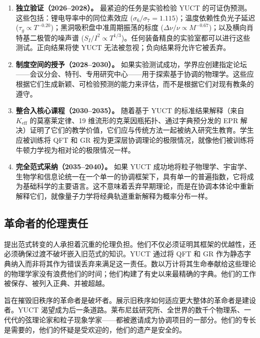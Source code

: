 \documentclass[12pt,a4paper]{article}
\begin{document}
	\begin{enumerate}
		\item \textbf{独立验证（2026–2028）。} 最紧迫的任务是实验检验 YUCT 的可证伪预测。这些包括：锂电导率中的同位素效应 (\(\sigma_6/\sigma_7 = 1.115\))；温度依赖性负光子延迟 (\(\tau_g \propto T^{-0.20}\))；黑洞吸积盘中准周期振荡的标度 (\(\Delta\nu/\nu \propto M^{-0.67}\))；以及横向肖特基二极管的噪声谱 (\(S_I/I^2 \propto T^{1/3}\))。任何装备精良的实验室都可以进行这些测试。正向结果将使 YUCT 无法被忽视；负向结果将允许它被丢弃。
		
		\item \textbf{制度空间的授予（2028–2030）。} 如果实验测试成功，学界应创建指定论坛——会议分会、特刊、专用研究中心——用于探索基于协调的物理学。这些应根据它们生成新颖、可检验预测的能力来评估，而不是根据它们对现有教条的遵守。
		
		\item \textbf{整合入核心课程（2030–2035）。} 随着基于 YUCT 的标准结果解释（来自 \(K_{\mathrm{eff}}\) 的莫塞莱定律、19 维流形的克莱因瓶拓扑、通过字典预分发的 EPR 解决）证明了它们的教学价值，它们应与传统方法一起被纳入研究生教育。学生应被训练将 QFT 和 GR 视为更深层协调理论的极限情况，就像他们被训练将牛顿力学视为相对论的极限情况一样。
		
		\item \textbf{完全范式采纳（2035–2040）。} 如果 YUCT 成功地将粒子物理学、宇宙学、生物学和信息论统一在一个单一的协调框架下，具有单一的普遍指数，它将成为基础科学的主要语言。这不意味着丢弃早期理论，而是在协调本体论中重新解释它们，就像量子力学将经典轨道重新解释为概率分布一样。
	\end{enumerate}
	
	\subsection{革命者的伦理责任}
	
	提出范式转变的人承担着沉重的伦理负担。他们不仅必须证明其框架的优越性，还必须确保过渡不破坏嵌入旧范式的知识。YUCT 通过将 QFT 和 GR 作为静态字典纳入而非将其作为错误丢弃来满足这一责任。数以万计将其生命奉献给这些理论的物理学家没有浪费他们的时间；他们构建了有史以来最精确的字典。他们的工作被保存、被列入正典、并被超越。
	
	旨在摧毁旧秩序的革命者是破坏者。展示旧秩序如何适应更大整体的革命者是建设者。YUCT 渴望成为后一条道路。莱布尼兹研究所、全世界的数千个物理系、一代代的弦理论家和粒子现象学家——都被邀请成为协调项目的一部分。他们的专长是需要的，他们的怀疑是受欢迎的，他们的遗产是安全的。
	
\end{document}
